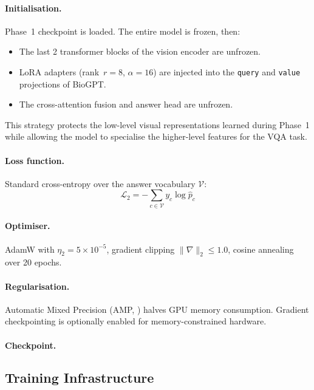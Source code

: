 \paragraph{Initialisation.}
Phase~1 checkpoint is loaded. The entire model is frozen, then:
\begin{itemize}
  \item The last 2 transformer blocks of the vision encoder are unfrozen.
  \item LoRA adapters (rank~$r=8$, $\alpha=16$) are injected into the
        \texttt{query} and \texttt{value} projections of BioGPT.
  \item The cross-attention fusion and answer head are unfrozen.
\end{itemize}

This strategy protects the low-level visual representations learned during
Phase~1 while allowing the model to specialise the higher-level features
for the VQA task.

\paragraph{Loss function.}
Standard cross-entropy over the answer vocabulary $\mathcal{V}$:
\begin{equation}
  \mathcal{L}_2 = -\sum_{c \in \mathcal{V}} y_c \log \hat{p}_c
  \label{eq:ce}
\end{equation}

\paragraph{Optimiser.}
AdamW with $\eta_2 = 5 \times 10^{-5}$, gradient clipping
$\|\nabla\|_2 \leq 1.0$, cosine annealing over 20 epochs.

\paragraph{Regularisation.}
Automatic Mixed Precision (AMP, ) halves GPU memory
consumption. Gradient checkpointing is optionally enabled for
memory-constrained hardware.

\paragraph{Checkpoint.}

\subsection{Training Infrastructure}
\label{subsec:train_infra}

